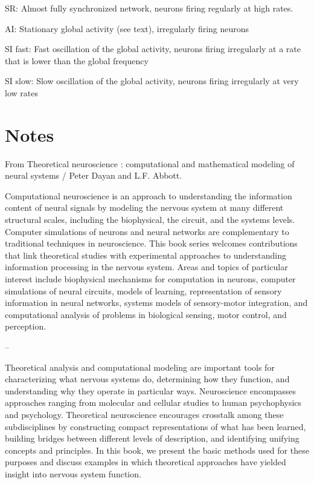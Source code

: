 SR: Almost fully synchronized network, neurons firing regularly at high rates.

AI: Stationary global activity (see text), irregularly firing neurons

SI fast: Fast oscillation of the global activity, neurons firing irregularly at a rate that is lower than the global frequency

SI slow: Slow oscillation of the global activity, neurons firing irregularly at very low rates



\section{Notes}


From Theoretical neuroscience : computational and mathematical modeling of neural
systems / Peter Dayan and L.F. Abbott.


Computational neuroscience is an approach to understanding the information content of neural signals by modeling the nervous system at many different structural scales, including the biophysical, the circuit, and the systems levels. Computer simulations of neurons and neural networks are complementary to traditional techniques in neuroscience. This book series welcomes contributions that link theoretical studies with experimental approaches to understanding information processing in the nervous system. Areas and topics of particular interest include biophysical mechanisms for computation in neurons, computer simulations of neural circuits, models of learning, representation of sensory information in neural networks, systems models of sensory-motor integration, and computational analysis of problems in biological sensing, motor control, and perception.

--

Theoretical analysis and computational modeling are important tools for characterizing what nervous systems do, determining how they function, and understanding why they operate in particular ways. Neuroscience encompasses approaches ranging from molecular and cellular studies to human psychophysics and psychology. Theoretical neuroscience encourages crosstalk among these subdisciplines by constructing compact representations of what has been learned, building bridges between different levels of description, and identifying unifying concepts and principles. In this book, we present the basic methods used for these purposes and discuss examples in which theoretical approaches have yielded insight into nervous system function.

